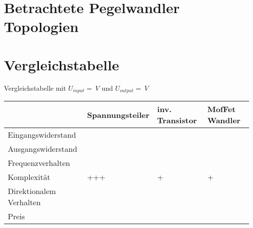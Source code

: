 \newpage
\section{Betrachtete Pegelwandler Topologien}\label{sec:pegel-topo}

\newpage

\newpage

\newpage



\newpage
\section{Vergleichstabelle}\label{sec:tab-vergleich}

\begin{table}
  
  \caption{Vergleichstabelle mit $U_{input} = \SI {}{V} $ und $U_{output} = \SI {}{V} $}
  \label{table:tabelle-vergleich1}
\end{table}
\begin{tabular}{l|l|l|l}
  & Spannungsteiler & inv. Transistor & MofFet Wandler \\
  \hline 
  Eingangswiderstand        & & & \\
  Ausgangswiderstand        & & & \\
  Frequenzverhalten         & & & \\
  Komplexität               & +++ & + & +  \\
  Direktionalem Verhalten   & & & \\
  Preis                     & & & \\
\end{tabular}




